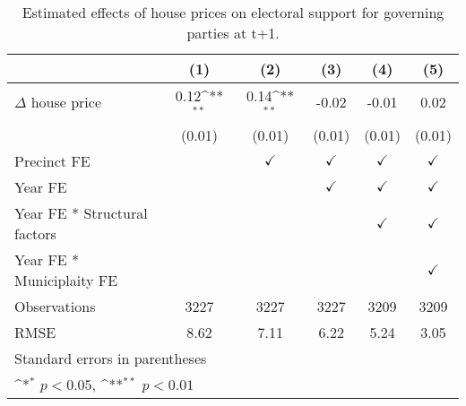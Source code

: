 \begin{table}[htbp]\centering
\def\sym#1{\ifmmode^{#1}\else\(^{#1}\)\fi}
\caption{Estimated effects of house prices on electoral support for governing parties at t+1.} \label{tab2}
\begin{tabular}{l*{5}{c}}
\hline\hline
                    &\multicolumn{1}{c}{(1)}        &\multicolumn{1}{c}{(2)}        &\multicolumn{1}{c}{(3)}        &\multicolumn{1}{c}{(4)}        &\multicolumn{1}{c}{(5)}        \\
\hline
$\Delta$ house price&        0.12\sym{**}&        0.14\sym{**}&       -0.02        &       -0.01        &        0.02        \\
                    &      (0.01)        &      (0.01)        &      (0.01)        &      (0.01)        &      (0.01)        \\
[1em]
\hline Precinct FE  &                    &$\checkmark$        &$\checkmark$        &$\checkmark$        &$\checkmark$        \\
[1em]
Year FE             &                    &                    &$\checkmark$        &$\checkmark$        &$\checkmark$        \\
[1em]
Year FE * Structural factors&                    &                    &                    &$\checkmark$        &$\checkmark$        \\
[1em]
Year FE * Municiplaity FE&                    &                    &                    &                    &$\checkmark$        \\
\hline
Observations        &        3227        &        3227        &        3227        &        3209        &        3209        \\
RMSE                &        8.62        &        7.11        &        6.22        &        5.24        &        3.05        \\
\hline\hline
\multicolumn{6}{l}{\footnotesize Standard errors in parentheses}\\
\multicolumn{6}{l}{\footnotesize \sym{*} \(p<0.05\), \sym{**} \(p<0.01\)}\\
\end{tabular}
\end{table}
